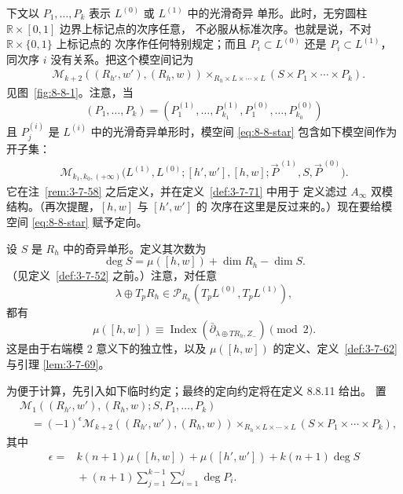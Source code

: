 下文以 $P_1,\ldots,P_k$ 表示 $L^{(0)}$ 或 $L^{(1)}$ 中的光滑奇异
单形。此时，无穷圆柱 $\mathbb R\times[0,1]$ 边界上标记点的次序任意，
不必服从标准次序。也就是说，不对 $\mathbb R\times\{0,1\}$ 上标记点的
次序作任何特别规定；而且 $P_i\subset L^{(0)}$ 还是
$P_i\subset L^{(1)}$，同次序 $i$ 没有关系。把这个模空间记为
\begin{equation}
\begin{aligned}
 &\mathcal M_{k+2}((R_{h'},w'),(R_h,w))
 \mathop{\times}_{R_h\times L\times\cdots\times L}
 (S\times P_1\times\cdots\times P_k).
\end{aligned}
\tag{*}\label{eq:8-8-star}
\end{equation}
见图~\ref{fig:8-8-1}。注意，当
\[
 (P_1,\ldots,P_k)
 =
 (P_1^{(1)},\ldots,P_{k_1}^{(1)},
  P_1^{(0)},\ldots,P_{k_0}^{(0)})
\]
且 $P_j^{(i)}$ 是 $L^{(i)}$ 中的光滑奇异单形时，模空间
\eqref{eq:8-8-star} 包含如下模空间作为开子集：
\[
\begin{aligned}
 \mathcal M_{k_1,k_0,(+\infty)}
 \bigl(
 L^{(1)},L^{(0)};[h',w'],[h,w];
 \vec P^{\,(1)},S,\vec P^{\,(0)}
 \bigr).
\end{aligned}
\]
它在注~\ref{rem:3-7-58} 之后定义，并在定义~\ref{def:3-7-71} 中用于
定义滤过 $A_\infty$ 双模结构。（再次提醒，$[h,w]$ 与 $[h',w']$ 的
次序在这里是反过来的。）现在要给模空间 \eqref{eq:8-8-star} 赋予定向。



设 $S$ 是 $R_h$ 中的奇异单形。定义其次数为
\begin{equation}
 \deg S=\mu([h,w])+\dim R_h-\dim S.
\tag{8.8.8}\label{eq:8-8-8}
\end{equation}
（见定义~\ref{def:3-7-52} 之前。）注意，对任意
\[
 \lambda\oplus T_pR_h
 \in\mathcal P_{R_h}(T_pL^{(0)},T_pL^{(1)}),
\]
都有
\[
 \mu([h,w])
 \equiv
 \operatorname{Index}
 (\bar\partial_{\lambda\oplus TR_h,Z_-})
 \pmod2.
\]
这是由于右端模 $2$ 意义下的独立性，以及
$\mu([h,w])$ 的定义、定义~\ref{def:3-7-62} 与引理
\ref{lem:3-7-69}。%

为便于计算，先引入如下临时约定；最终的定向约定将在定义 8.8.11 给出。
置
\[
\begin{aligned}
 &\mathcal M_1
 ((R_{h'},w'),(R_h,w);S,P_1,\ldots,P_k)\\
 &\quad=
 (-1)^\epsilon
 \mathcal M_{k+2}((R_{h'},w'),(R_h,w))
 \mathop{\times}_{R_h\times L\times\cdots\times L}
 (S\times P_1\times\cdots\times P_k),
\end{aligned}
\]
其中
\[
\begin{aligned}
 \epsilon={}&
 k(n+1)\mu([h,w])+\mu([h',w'])
 +k(n+1)\deg S\\
 &{}+(n+1)
 \sum_{j=1}^{k-1}\sum_{i=1}^{j}\deg P_i.
\end{aligned}
\]

